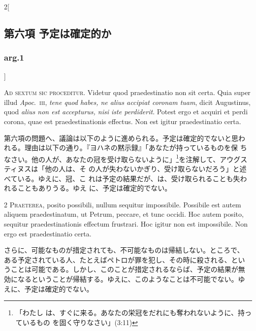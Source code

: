 \documentclass[paper=a4paper,fontsize=10pt,jafontsize=9pt,titlepage]{jlreq}
\begin{document}
\begin{paracol}{2}[\subsection{第六項 予定は確定的か}\subsubsection{arg.1}]

{\Huge A}{\scshape d sextum sic proceditur}. Videtur quod
praedestinatio non sit certa. Quia super illud {\itshape Apoc}.~{\scshape iii}, {\itshape tene quod
habes, ne alius accipiat coronam tuam}, dicit Augustinus, quod {\itshape alius non
est accepturus, nisi iste perdiderit}. Potest ergo et acquiri et perdi
corona, quae est praedestinationis effectus. Non est igitur
praedestinatio certa.


\switchcolumn


第六項の問題へ、議論は以下のように進められる。予定は確定的でないと思わ
れる。理由は以下の通り。『ヨハネの黙示録』「あなたが持っているものを保
ちなさい。他の人が、あなたの冠を受け取らないように」\footnote{「わたし
は、すぐに来る。あなたの栄冠をだれにも奪われないように、持っているもの
を固く守りなさい」(3:11)}を注解して、アウグスティヌスは「他の人は、そ
の人が失わないかぎり、受け取らないだろう」と述べている。ゆえに、冠、こ
れは予定の結果だが、は、受け取られることも失われることもありうる。ゆえ
に、予定は確定的でない。




{\scshape 2 Praeterea}, posito possibili, nullum
sequitur impossibile. Possibile est autem aliquem praedestinatum, ut
Petrum, peccare, et tunc occidi. Hoc autem posito, sequitur
praedestinationis effectum frustrari. Hoc igitur non est
impossibile. Non ergo est praedestinatio certa.


\switchcolumn


さらに、可能なものが措定されても、不可能なものは帰結しない。ところで、
ある予定されている人、たとえばペトロが罪を犯し、その時に殺される、とい
うことは可能である。しかし、このことが措定されるならば、予定の結果が無
効になるということが帰結する。ゆえに、このようなことは不可能でない。ゆ
えに、予定は確定的でない。





\end{paracol}
\end{document}
